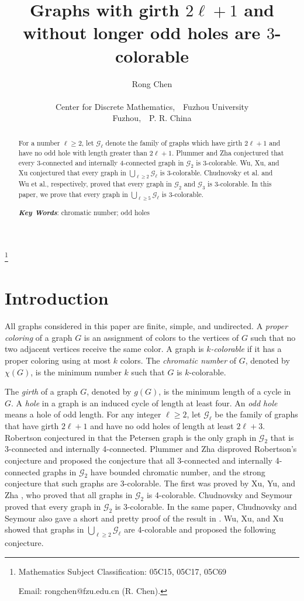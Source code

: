 \documentclass[11pt]{article}
\title{Graphs with girth $2\ell+1$ and without longer odd holes are $3$-colorable}
\author{Rong Chen\\
\\
Center for Discrete Mathematics,\ \ Fuzhou University\\
Fuzhou,\ \ P. R. China}
\begin{document}
\maketitle

\footnote{Mathematics Subject Classification: 05C15, 05C17, 05C69

Email: rongchen@fzu.edu.cn (R. Chen).
}


\begin{abstract}
For a number $\ell\geq 2$, let $\mathcal{G}_{\ell}$ denote the family of graphs which have girth $2\ell+1$ and have no odd hole with length greater than $2\ell+1$. Plummer and Zha conjectured that every 3-connected and internally 4-connected graph in $\mathcal{G}_2$ is 3-colorable. Wu, Xu, and Xu conjectured that every graph in $\bigcup_{\ell\geq2}\mathcal{G}_{\ell}$ is 3-colorable. Chudnovsky et al. and Wu et al., respectively, proved that every graph in $\mathcal{G}_2$ and $\mathcal{G}_3$ is 3-colorable. In this paper, we prove that every graph in $\bigcup_{\ell\geq5}\mathcal{G}_{\ell}$ is 3-colorable.

{\it\bf Key Words}: chromatic number; odd holes
\end{abstract}



\section{Introduction}

All graphs considered in this paper are finite, simple, and undirected.
A {\em proper coloring} of a graph $G$ is an assignment of colors to the vertices of $G$ such that no two adjacent vertices receive the same color. A graph is {\em $k$-colorable} if it has a proper coloring using at most $k$ colors. The {\em chromatic number} of $G$, denoted by $\chi(G)$, is the minimum number $k$ such that $G$ is $k$-colorable.

The {\em girth} of a graph $G$, denoted by $g(G)$, is the minimum length of a cycle in $G$. A {\em hole} in a graph is an induced cycle of length at least four. An {\em odd hole} means a hole of odd length. For any integer $\ell\geq2$, let $\mathcal{G}_{\ell}$ be the family of graphs that have girth $2\ell + 1$ and have no odd holes of length at least $2\ell + 3$.  Robertson conjectured in \cite{ND11} that the Petersen graph is  the only graph in $\mathcal{G}_2$ that is 3-connected and internally 4-connected.
Plummer and Zha \cite{PM14} disproved Robertson's conjecture and proposed the conjecture that all 3-connected and internally 4-connected graphs in $\mathcal{G}_2$ have bounded chromatic number, and the strong conjecture that such graphs are 3-colorable. The first was proved by Xu, Yu, and Zha \cite{XB17}, who proved that all graphs in $\mathcal{G}_2$ is 4-colorable. Chudnovsky and Seymour \cite{MC22} proved that every graph in $\mathcal{G}_2$ is 3-colorable. In the same paper, Chudnovsky and Seymour also gave a short and pretty proof of the result in \cite{XB17}.
Wu, Xu, and Xu \cite{WD2204} showed that graphs in $\bigcup_{\ell\geq2}\mathcal{G}_{\ell}$  are 4-colorable and proposed the following conjecture.
\end{document}
